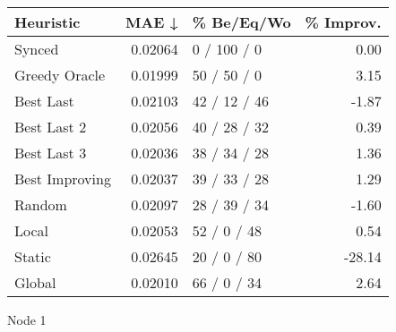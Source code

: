 \begin{tabular}{lrlr}
\toprule
\textbf{Heuristic} & \textbf{MAE ↓} & \textbf{\% Be/Eq/Wo} & \textbf{\% Improv.} \\
\midrule
            Synced &        0.02064 &          0 / 100 / 0 &                0.00 \\
     Greedy Oracle &        0.01999 &          50 / 50 / 0 &                3.15 \\
         Best Last &        0.02103 &         42 / 12 / 46 &               -1.87 \\
       Best Last 2 &        0.02056 &         40 / 28 / 32 &                0.39 \\
       Best Last 3 &        0.02036 &         38 / 34 / 28 &                1.36 \\
    Best Improving &        0.02037 &         39 / 33 / 28 &                1.29 \\
            Random &        0.02097 &         28 / 39 / 34 &               -1.60 \\
             Local &        0.02053 &          52 / 0 / 48 &                0.54 \\
            Static &        0.02645 &          20 / 0 / 80 &              -28.14 \\
            Global &        0.02010 &          66 / 0 / 34 &                2.64 \\
\bottomrule
\end{tabular}
\caption{Node 1}
\label{tab:iid_lr01_le2_bs2_1}
